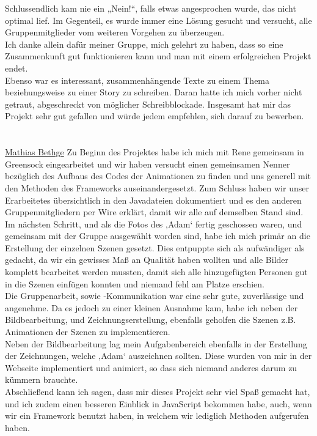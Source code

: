 Schlussendlich kam nie ein „Nein!“, falls etwas angesprochen wurde, das nicht optimal lief. Im Gegenteil, es wurde immer eine Lösung gesucht und versucht, alle Gruppenmitglieder vom weiteren Vorgehen zu überzeugen.\\
Ich danke allein dafür meiner Gruppe, mich gelehrt zu haben, dass so eine Zusammenkunft gut funktionieren kann und man mit einem erfolgreichen Projekt endet.\\
Ebenso war es interessant, zusammenhängende Texte zu einem Thema beziehungsweise zu einer Story zu schreiben. Daran hatte ich mich vorher nicht getraut, abgeschreckt von möglicher Schreibblockade.
Insgesamt hat mir das Projekt sehr gut gefallen und würde jedem empfehlen, sich darauf zu bewerben.\\
\\
\\
\underline{Mathias Bethge}
Zu Beginn des Projektes habe ich mich mit Rene gemeinsam in Greensock eingearbeitet und wir haben versucht einen gemeinsamen Nenner bezüglich des Aufbaus des Codes der Animationen zu finden und uns generell mit den Methoden des Frameworks auseinandergesetzt. Zum Schluss haben wir unser Erarbeitetes übersichtlich in den Javadateien dokumentiert und es den anderen Gruppenmitgliedern per Wire erklärt, damit wir alle auf demselben Stand sind.\\
Im nächsten Schritt, und als die Fotos des ‚Adam‘ fertig geschossen waren, und gemeinsam mit der Gruppe ausgewählt worden sind, habe ich mich primär an die Erstellung der einzelnen Szenen gesetzt. Dies entpuppte sich als aufwändiger als gedacht, da wir ein gewisses Maß an Qualität haben wollten und alle Bilder komplett bearbeitet werden mussten, damit sich alle hinzugefügten Personen gut in die Szenen einfügen konnten und niemand fehl am Platze erschien.\\
Die Gruppenarbeit, sowie -Kommunikation war eine sehr gute, zuverlässige und angenehme. Da es jedoch zu einer kleinen Ausnahme kam, habe ich neben der Bildbearbeitung, und Zeichnungserstellung, ebenfalls geholfen die Szenen z.B. Animationen der Szenen zu implementieren.\\
Neben der Bildbearbeitung lag mein Aufgabenbereich ebenfalls in der Erstellung der Zeichnungen, welche ‚Adam‘ auszeichnen sollten. Diese wurden von mir in der Webseite implementiert und animiert, so dass sich niemand anderes darum zu kümmern brauchte.\\
Abschließend kann ich sagen, dass mir dieses Projekt sehr viel Spaß gemacht hat, und ich zudem einen besseren Einblick in JavaScript bekommen habe, auch, wenn wir ein Framework benutzt haben, in welchem wir lediglich Methoden aufgerufen haben.\\
